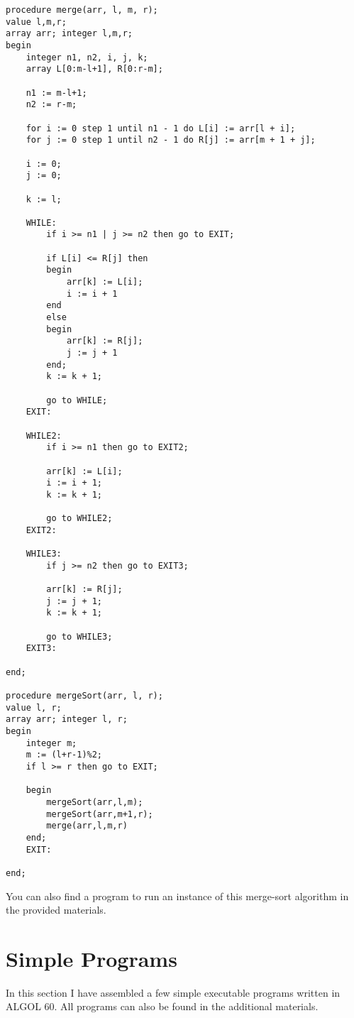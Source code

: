 \documentclass{article}
\begin{document}
\begin{lstlisting}[language={[60]algol}]
procedure merge(arr, l, m, r);
value l,m,r;
array arr; integer l,m,r;
begin
    integer n1, n2, i, j, k;
    array L[0:m-l+1], R[0:r-m];
    
    n1 := m-l+1;
    n2 := r-m;
    
    for i := 0 step 1 until n1 - 1 do L[i] := arr[l + i];
    for j := 0 step 1 until n2 - 1 do R[j] := arr[m + 1 + j];
    
    i := 0;
    j := 0;
    
    k := l;
    
    WHILE:
        if i >= n1 | j >= n2 then go to EXIT;
        
        if L[i] <= R[j] then 
        begin 
            arr[k] := L[i]; 
            i := i + 1 
        end
        else
        begin
            arr[k] := R[j];
            j := j + 1
        end;
        k := k + 1;
        
        go to WHILE;
    EXIT:
    
    WHILE2:
        if i >= n1 then go to EXIT2;
        
        arr[k] := L[i];
        i := i + 1;
        k := k + 1;
        
        go to WHILE2;
    EXIT2:
    
    WHILE3:
        if j >= n2 then go to EXIT3;
    
        arr[k] := R[j];
        j := j + 1;
        k := k + 1;
    
        go to WHILE3;
    EXIT3:
    
end;
    
procedure mergeSort(arr, l, r);
value l, r;
array arr; integer l, r;
begin
    integer m;
    m := (l+r-1)%2;
    if l >= r then go to EXIT;
    
    begin
        mergeSort(arr,l,m);
        mergeSort(arr,m+1,r);
        merge(arr,l,m,r)
    end;
    EXIT:

end;
\end{lstlisting}

You can also find a program to run an instance of this merge-sort algorithm in the provided materials.

\newpage

\section{Simple Programs} \label{simpleProg}
In this section I have assembled a few simple executable programs written in ALGOL 60. All programs can also be found in the additional materials.
\end{document}
